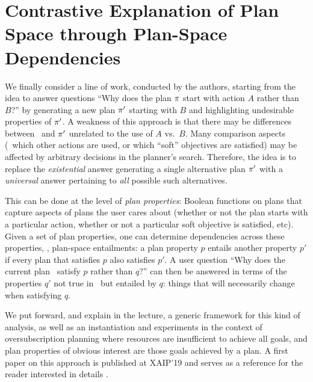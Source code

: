 \section{Contrastive Explanation of Plan Space through Plan-Space Dependencies}
\label{xpp}

We finally consider a line of work, conducted by the authors, starting
from the idea to answer questions ``Why does the plan $\pi$ start
with action $A$ rather than $B$?'' by generating a new plan $\pi'$
starting with $B$ and highlighting undesirable properties of
$\pi'$. A weakness of this approach is that there may be differences
between \plan\ and $\pi'$ unrelated to the use of $A$ vs.\ $B$. Many
comparison aspects (\eg\ which other actions are used, or which
``soft'' objectives are satisfied) may be affected by arbitrary
decisions in the planner's search. Therefore, the idea is to replace
the \emph{existential} answer generating a single alternative plan
$\pi'$ with a \emph{universal} answer pertaining to \emph{all}
possible such alternatives.

This can be done at the level of \emph{plan properties}: Boolean
functions on plans that capture aspects of plans the user cares about
(whether or not the plan starts with a particular action, whether or
not a particular soft objective is satisfied, etc). Given a set of
plan properties, one can determine dependencies across these
properties, \ie, plan-space entailments: a plan property $p$ entails
another property $p'$ if every plan that satisfies $p$ also satisfies
$p'$. A user question ``Why does the current plan \plan\ satisfy $p$
rather than $q$?'' can then be answered in terms of the properties
$q'$ not true in \plan\ but entailed by $q$: things that will
necessarily change when satisfying $q$.

We put forward, and explain in the lecture, a generic framework for
this kind of analysis, as well as an instantiation and experiments in
the context of oversubscription planning
\cite{smith:icaps-04,domshlak:mirkis:jair-15} where resources are
insufficient to achieve all goals, and plan properties of obvious
interest are those goals achieved by a plan. A first paper on this
approach is published at XAIP'19 and serves as a reference for the
reader interested in details \cite{eifler:etal:xaip-19}.
